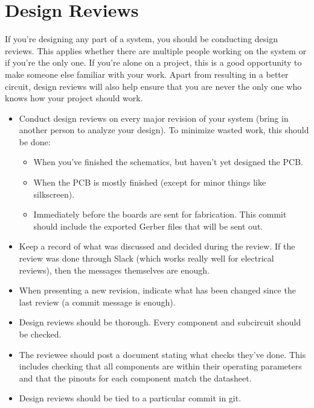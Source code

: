 \documentclass{article}
\begin{document}
\section{Design Reviews}
If you're designing any part of a system, you should be conducting design reviews. This applies whether there are multiple people working on the system or if you're the only one. If you're alone on a project, this is a good opportunity to make someone else familiar with your work. Apart from resulting in a better circuit, design reviews will also help ensure that you are never the only one who knows how your project should work.
\begin{itemize}
\item  Conduct design reviews on every major revision of your system (bring in another person to analyze your design). To minimize wasted work, this should be done:
    \begin{itemize}
    \item When you've finished the schematics, but haven't yet designed the PCB.
    \item When the PCB is mostly finished (except for minor things like silkscreen).
    \item Immediately before the boards are sent for fabrication. This commit should include the exported Gerber files that will be sent out.
    \end{itemize}
\item Keep a record of what was discussed and decided during the review. If the review was done through Slack (which works really well for electrical reviews), then the messages themselves are enough.
\item When presenting a new revision, indicate what has been changed since the last review (a commit message is enough).
\item Design reviews should be thorough. Every component and subcircuit should be checked.
\item The reviewee should post a document stating what checks they've done. This includes checking that all components are within their operating parameters and that the pinouts for each component match the datasheet.
\item Design reviews should be tied to a particular commit in git.
\end{itemize}
\end{document}
